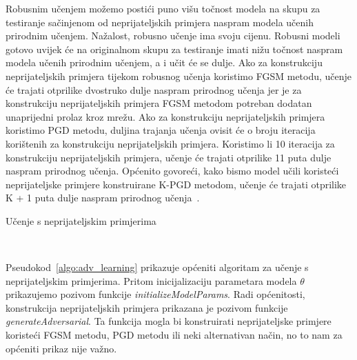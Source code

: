 \documentclass[times, utf8, zavrsni, numeric]{fer}
\begin{document}
\pagebreak

Robusnim učenjem možemo postići puno višu točnost modela na skupu za testiranje sačinjenom od neprijateljskih primjera naspram modela učenih prirodnim učenjem.
Nažalost, robusno učenje ima svoju cijenu. Robusni modeli gotovo uvijek će na originalnom skupu za testiranje imati nižu točnost naspram modela učenih prirodnim učenjem,
a i učit će se dulje. Ako za konstrukciju neprijateljskih primjera tijekom robusnog učenja koristimo FGSM metodu, učenje će trajati otprilike dvostruko dulje naspram prirodnog učenja
jer je za konstrukciju neprijateljskih primjera FGSM metodom potreban dodatan unaprijedni prolaz kroz mrežu. 
Ako za konstrukciju neprijateljskih primjera koristimo PGD metodu, duljina trajanja učenja ovisit će o broju iteracija korištenih za konstrukciju neprijateljskih primjera.
Koristimo li 10 iteracija za konstrukciju neprijateljskih primjera, učenje će trajati otprilike 11 puta dulje naspram prirodnog učenja. 
Općenito govoreći, kako bismo model učili koristeći neprijateljske primjere konstruirane K-PGD metodom, učenje će trajati otprilike K + 1 puta dulje naspram prirodnog učenja~\cite{shafahi2019adversarial}.

\begin{algorithm}
    \caption{Učenje s neprijateljskim primjerima}
    \label{algo:adv_learning}
    \begin{algorithmic}
        \\\hrulefill
            \ENDFOR
        \ENDFOR
    \end{algorithmic}
\end{algorithm}

Pseudokod~\ref{algo:adv_learning} prikazuje općeniti algoritam za učenje s neprijateljskim primjerima.
Pritom inicijalizaciju parametara modela $\theta$ prikazujemo pozivom funkcije \textit{initializeModelParams}.
Radi općenitosti, konstrukcija neprijateljskih primjera prikazana je pozivom funkcije \textit{generateAdversarial}.
Ta funkcija mogla bi konstruirati neprijateljske primjere koristeći FGSM metodu, PGD metodu ili neki alternativan način, no to nam za općeniti prikaz nije važno.
\end{document}
